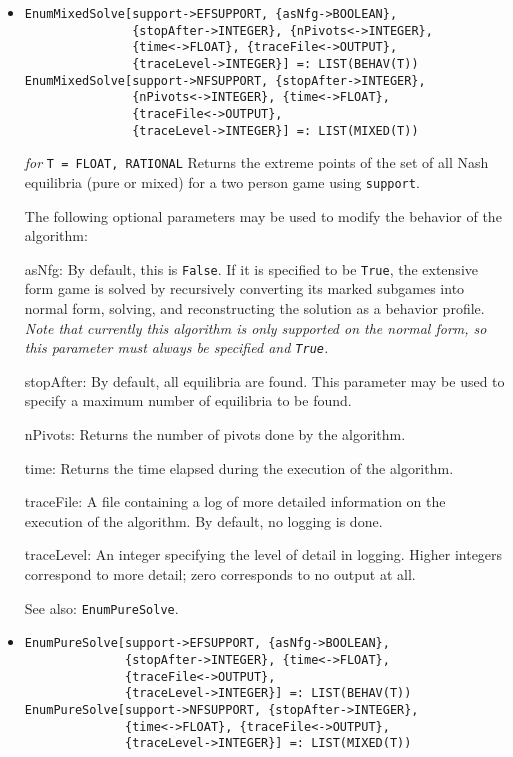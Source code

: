 \begin{itemize}
\item{}
\protect \large \begin{verbatim}
EnumMixedSolve[support->EFSUPPORT, {asNfg->BOOLEAN}, 
               {stopAfter->INTEGER}, {nPivots<->INTEGER}, 
               {time<->FLOAT}, {traceFile<->OUTPUT},
               {traceLevel->INTEGER}] =: LIST(BEHAV(T))
EnumMixedSolve[support->NFSUPPORT, {stopAfter->INTEGER},
               {nPivots<->INTEGER}, {time<->FLOAT},
               {traceFile<->OUTPUT},
               {traceLevel->INTEGER}] =: LIST(MIXED(T))
\end{verbatim}\normalsize

{\it for} {\tt T = FLOAT, RATIONAL}
\bd
Returns the extreme points of the set of all Nash equilibria (pure or
mixed) for a two person game using \verb+support+.

The following optional parameters may be used to modify the behavior
of the algorithm:
\bd
\item
[asNfg:] By default, this is \verb+False+.  If it is specified to be
\verb+True+, the extensive form game is solved by recursively converting
its marked subgames into normal form, solving, and reconstructing the
solution as a behavior profile.  {\it Note that currently this algorithm
is only supported on the normal form, so this parameter
must always be specified and {\tt True}.} 
\item
[stopAfter:] By default, all equilibria are found.  This parameter may
be used to specify a maximum number of equilibria to be found.
\item
[nPivots:] Returns the number of pivots done by the
algorithm.
\item
[time:] Returns the time elapsed during the execution
of the algorithm.
\item
[traceFile:] A file containing a log of more detailed information on the
execution of the algorithm.  By default, no logging is done.
\item
[traceLevel:] An integer specifying the level of detail in logging.
Higher integers correspond to more detail; zero corresponds to no output
at all.
\ed
\item [See also:] \verb+EnumPureSolve+.
\ed

\item{}
\protect \large \begin{verbatim}
EnumPureSolve[support->EFSUPPORT, {asNfg->BOOLEAN},
              {stopAfter->INTEGER}, {time<->FLOAT},
              {traceFile<->OUTPUT},
              {traceLevel->INTEGER}] =: LIST(BEHAV(T))
EnumPureSolve[support->NFSUPPORT, {stopAfter->INTEGER},
              {time<->FLOAT}, {traceFile<->OUTPUT},
              {traceLevel->INTEGER}] =: LIST(MIXED(T)) 
\end{verbatim}\normalsize


\end{itemize}
